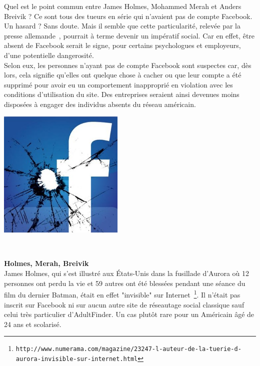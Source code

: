 \documentclass[11pt,twoside,a4paper]{article}
\begin{document}
\begin{minipage}[ht]{0.68\textwidth} 
Quel est le point commun entre James Holmes, Mohammed Merah et Anders Breivik ? Ce sont tous des tueurs en s{\'e}rie qui n'avaient pas de compte Facebook. Un hasard ? Sans doute. Mais il semble que cette particularit{\'e}, relev{\'e}e par la presse allemande~\footnotemark , pourrait {\`a} terme devenir un imp{\'e}ratif social. Car en effet, {\^e}tre absent de Facebook serait le signe, pour certains psychologues et employeurs, d'une potentielle dangerosit{\'e}.~\\

Selon eux, les personnes n'ayant pas de compte Facebook sont suspectes car, d{\`e}s lors, cela signifie qu'elles ont quelque chose {\`a} cacher ou que leur compte a {\'e}t{\'e} supprim{\'e} pour avoir eu un comportement inappropri{\'e} en violation avec les conditions d'utilisation du site. Des entreprises seraient ainsi devenues moins dispos{\'e}es {\`a} engager des individus absents du r{\'e}seau am{\'e}ricain.~\\
\end{minipage} \hfill \begin{minipage}[ht]{0.31\textwidth} 
	\includegraphics[width=6cm]{img/facebookfaille.jpg}
\end{minipage}
~

\textbf{Holmes, Merah, Breivik}~\\

James Holmes, qui s'est illustr{\'e} aux {\'E}tats-Unis dans la fusillade d'Aurora o{\`u} 12 personnes ont perdu la vie et 59 autres ont {\'e}t{\'e} bless{\'e}es pendant une s{\'e}ance du film du dernier Batman, {\'e}tait en effet "invisible" sur Internet~\footnote{\texttt{http://www.numerama.com/magazine/23247-l-auteur-de-la-tuerie-d-aurora-invisible-sur-internet.html}}. Il n'{\'e}tait pas inscrit sur Facebook ni sur aucun autre site de r{\'e}seautage social classique sauf celui tr{\`e}s particulier d'AdultFinder. Un cas plut{\^o}t rare pour un Am{\'e}ricain {\^a}g{\'e} de 24 ans et scolaris{\'e}.~\\
\end{document}
